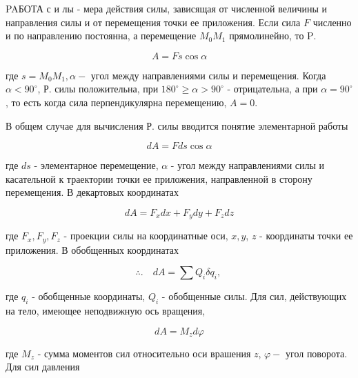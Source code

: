 \documentclass[10pt]{article}
\begin{document}
PAБОТА с и лы - мера действия силы, зависящая от численной величины и направления силы и от перемещения точки ее приложения. Если сила $F$ численно и по направлению постоянна, а перемещение $M_{0} M_{1}$ прямолинейно, то $\mathrm{P}$.



\[

A=F s \cos \alpha

\]



где $s=M_{0} M_{1}, \alpha-$ угол между направлениями силы и перемещения. Когда $\alpha<90^{\circ}$, Р. силы положительна, при $180^{\circ} \geqslant \alpha>90^{\circ}$ - отрицательна, а при $\alpha=90^{\circ}$, то есть когда сила перпендикулярна перемещению, $A=0$.



В общем случае для вычисления Р. силы вводится понятие элементарной работы



\[

d A=F d s \cos \alpha

\]



где $d s$ - элементарное перемещение, $\alpha$ - угол между направлениями силы и касательной к траектории точки ее приложения, направленной в сторону перемещения. В декартовых координатах



\[

d A=F_{x} d x+F_{y} d y+F_{z} d z

\]



где $F_{x}, F_{y}, F_{z}$ - проекции силы на координатные оси, $x, y$, $z$ - координаты точки ее приложения. В обобщенных координатах



\[

\therefore . \quad d A=\sum Q_{i} \delta q_{i} \text {, }

\]



где $q_{i}$ - обобщенные координаты, $Q_{i}$ - обобщенные силы. Для сил, действующих на тело, имеющее неподвижную ось вращения,



\[

d A=M_{z} d \varphi

\]



где $M_{z}$ - сумма моментов сил относительно оси врашения $z$, $\varphi-$ угол поворота. Для сил давления
\end{document}
